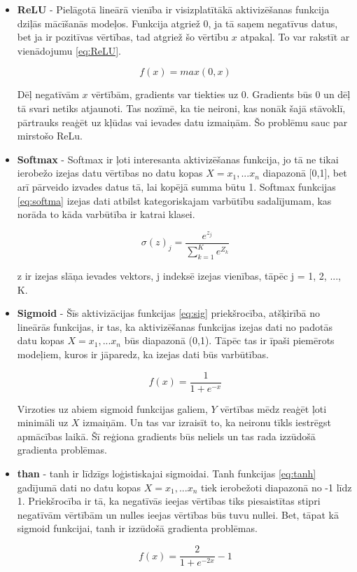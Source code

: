 \documentclass[12pt,paper=A4]{report}
\begin{document}
\begin{itemize}
\item \textbf{ReLU} - Pielāgotā lineārā vienība ir visizplatītākā aktivizēšanas funkcija dziļās mācīšanās modeļos. Funkcija atgriež 0, ja tā saņem negatīvus datus, bet ja ir pozitīvas vērtības, tad atgriež šo vērtību $x$ atpakaļ. To var rakstīt ar vienādojumu \ref{eq:ReLU}.

\begin{equation}
f (x) = max (0, x)
\label{eq:ReLU}
\end{equation}

Dēļ negatīvām $x$ vērtībām, gradients var tiekties uz 0. Gradients būs 0 un dēļ tā svari netiks atjaunoti. Tas nozīmē, ka tie neironi, kas nonāk šajā stāvoklī, pārtrauks reaģēt uz kļūdas vai ievades datu izmaiņām. Šo problēmu sauc par mirstošo ReLu.

\item \textbf{Softmax} - Softmax ir ļoti interesanta aktivizēšanas funkcija, jo tā ne tikai ierobežo izejas datu vērtības no datu kopas $X = {x_1,...x_n}$ diapazonā [0,1], bet arī pārveido izvades datus tā, lai kopējā summa būtu 1. Softmax funkcijas \ref{eq:softma} izejas dati atbilst kategoriskajam varbūtību sadalījumam, kas norāda to kāda varbūtība ir katrai klasei.

\begin{equation}
\sigma(z)_j = \frac{e^{z_j}}{\sum^{K}_{k=1} e^{Z_k}}
\label{eq:softma}
\end{equation}

z ir izejas slāņa ievades vektors,
j indeksē izejas vienības, tāpēc j = 1, 2, ..., K.

\item \textbf{Sigmoid} - Šīs aktivizācijas funkcijas \ref{eq:sig} priekšrocība, atšķirībā no lineārās funkcijas, ir tas, ka aktivizēšanas funkcijas izejas dati no padotās datu kopas $X = {x_1,...x_n}$ būs diapazonā (0,1). Tāpēc tas ir īpaši piemērots modeļiem, kuros ir jāparedz, ka izejas dati būs varbūtības. 

\begin{equation}
f(x) = \frac{1}{1+e^{-x}}
\label{eq:sig}
\end{equation}

Virzoties uz abiem sigmoid funkcijas galiem, $Y$ vērtības mēdz reaģēt ļoti minimāli uz $X$ izmaiņām. Un tas var izraisīt to, ka neironu tīkls iestrēgst apmācības laikā. Šī reģiona gradients būs neliels un tas rada izzūdošā gradienta problēmas.

\item \textbf{than} - tanh ir līdzīgs loģistiskajai sigmoidai. Tanh funkcijas \ref{eq:tanh} gadījumā dati no datu kopas $X = {x_1,...x_n}$ tiek ierobežoti diapazonā no -1 līdz 1.  Priekšrocība ir tā, ka negatīvās ieejas vērtības tiks piesaistītas stipri negatīvām vērtībām un nulles ieejas vērtības būs tuvu nullei. Bet, tāpat kā sigmoid funkcijai, tanh ir izzūdošā gradienta problēmas.

\begin{equation}
f(x) = \frac{2}{1+e^{-2x}}-1
\label{eq:tanh}
\end{equation}

\end{itemize}
\end{document}
